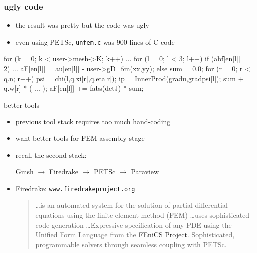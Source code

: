 \documentclass[hide notes,intlimits,usenames,dvipsnames]{beamer}
\begin{document}
\begin{frame}[fragile]
\frametitle{ugly code}

\begin{itemize}
\item the result was pretty but the code was ugly
\item even using PETSc, \texttt{unfem.c} was 900 lines of C code
\end{itemize}
\begin{scode}
for (k = 0; k < user->mesh->K; k++) {
    ...
    for (l = 0; l < 3; l++) {
        if (abf[en[l]] == 2) {
            ...
            aF[en[l]] = au[en[l]] - user->gD_fcn(xx,yy);
        } else {
            sum = 0.0;
            for (r = 0; r < q.n; r++) {
                psi = chi(l,q.xi[r],q.eta[r]);
                ip  = InnerProd(gradu,gradpsi[l]);
                sum += q.w[r] * ( ... );
            }
            aF[en[l]] += fabs(detJ) * sum;
        }
    }
}
\end{scode}
\end{frame}


\begin{frame}{better tools}
\begin{itemize}
\item previous tool stack requires too much hand-coding
\item want better tools for FEM assembly stage
\item recall the second stack:
\begin{center} \color{Magenta}
Gmsh $\to$ Firedrake $\to$ PETSc $\to$ Paraview %
\end{center}
\item Firedrake: \quad \href{https://www.firedrakeproject.org/}{\color{blue}\texttt{www.firedrakeproject.org}}
\begin{quote}
\dots is an automated system for the solution of partial differential equations using the finite element method (FEM) \dots uses sophisticated code generation \dots Expressive specification of any PDE using the Unified Form Language from the \href{https://fenicsproject.org/}{\color{blue} FEniCS Project}.  Sophisticated, programmable solvers through seamless coupling with PETSc.
\end{quote}
\end{itemize}
\end{frame}
\end{document}
